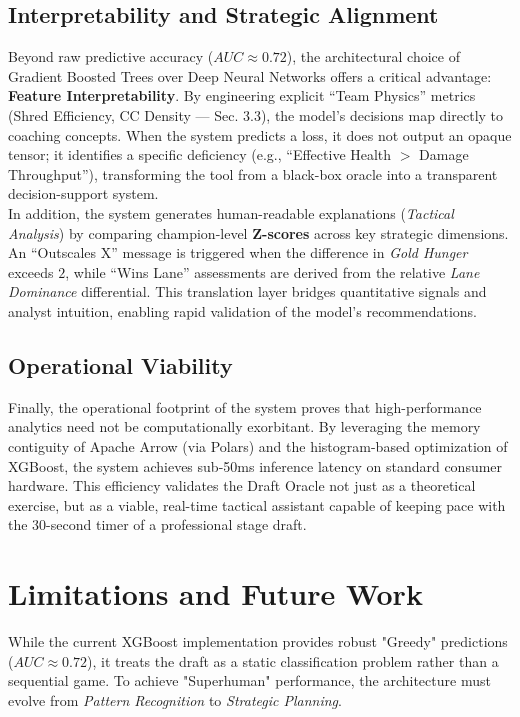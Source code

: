 \documentclass[12pt, a4paper]{article}
\begin{document}
    \subsection{Interpretability and Strategic Alignment}

    Beyond raw predictive accuracy ($AUC \approx 0.72$), the architectural choice of Gradient Boosted Trees over Deep Neural Networks offers a critical advantage: \textbf{Feature Interpretability}. By engineering explicit ``Team Physics'' metrics (Shred Efficiency, CC Density — Sec. 3.3), the model’s decisions map directly to coaching concepts. When the system predicts a loss, it does not output an opaque tensor; it identifies a specific deficiency (e.g., ``Effective Health $>$ Damage Throughput''), transforming the tool from a black-box oracle into a transparent decision-support system.\\


    In addition, the system generates human-readable explanations (\textit{Tactical Analysis}) by comparing champion-level \textbf{Z-scores} across key strategic dimensions. An ``Outscales X'' message is triggered when the difference in \textit{Gold Hunger} exceeds $2$, while ``Wins Lane'' assessments are derived from the relative \textit{Lane Dominance} differential. This translation layer bridges quantitative signals and analyst intuition, enabling rapid validation of the model’s recommendations.



    \subsection{Operational Viability}
    Finally, the operational footprint of the system proves that high-performance analytics need not be computationally exorbitant. By leveraging the memory contiguity of Apache Arrow (via Polars) and the histogram-based optimization of XGBoost, the system achieves sub-50ms inference latency on standard consumer hardware. This efficiency validates the Draft Oracle not just as a theoretical exercise, but as a viable, real-time tactical assistant capable of keeping pace with the 30-second timer of a professional stage draft.

    \newpage


    \section{Limitations and Future Work}

    While the current XGBoost implementation provides robust "Greedy" predictions ($AUC \approx 0.72$), it treats the draft as a static classification problem rather than a sequential game. To achieve "Superhuman" performance, the architecture must evolve from \textit{Pattern Recognition} to \textit{Strategic Planning}.
\end{document}
